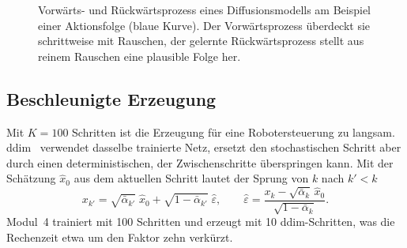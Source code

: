 \begin{figure}[htbp]
  \centering
  \caption[Vorwärts- und Rückwärtsprozess eines Diffusionsmodells]{Vorwärts- und
  Rückwärtsprozess eines Diffusionsmodells am Beispiel einer Aktionsfolge (blaue Kurve).
  Der Vorwärtsprozess überdeckt sie schrittweise mit Rauschen, der gelernte Rückwärtsprozess
  stellt aus reinem Rauschen eine plausible Folge her.}
  \label{fig:diffusion}
\end{figure}

\subsection{Beschleunigte Erzeugung}

Mit $K = 100$ Schritten ist die Erzeugung für eine Robotersteuerung zu langsam.
\ac{ddim}~\cite{song2021} verwendet dasselbe trainierte Netz, ersetzt den stochastischen
Schritt aber durch einen deterministischen, der Zwischenschritte überspringen kann. Mit der
Schätzung $\hat x_0$ aus dem aktuellen Schritt lautet der Sprung von $k$ nach $k' < k$
\begin{equation}
  x_{k'} = \sqrt{\bar\alpha_{k'}}\;\hat x_0
         + \sqrt{1-\bar\alpha_{k'}}\;\hat\varepsilon,
  \qquad \hat\varepsilon = \frac{x_k - \sqrt{\bar\alpha_k}\,\hat x_0}{\sqrt{1-\bar\alpha_k}} .
  \label{eq:ddim}
\end{equation}
Modul~4 trainiert mit 100 Schritten und erzeugt mit 10 \ac{ddim}-Schritten, was die
Rechenzeit etwa um den Faktor zehn verkürzt.

